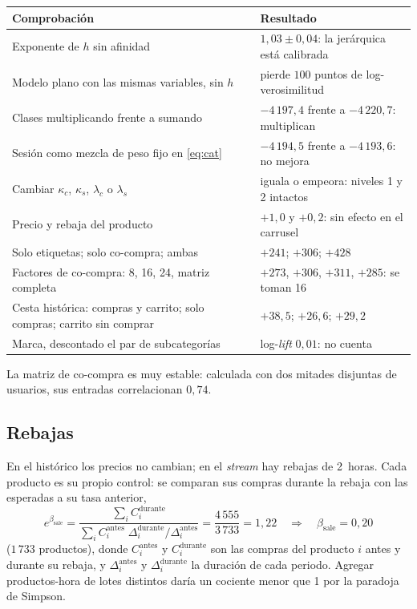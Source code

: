 \documentclass[11pt,a4paper]{article}
\begin{document}
\begin{center}
\small
\begin{tabular}{p{8.3cm}p{6.6cm}}
\toprule
Comprobación & Resultado\\
\midrule
Exponente de $h$ sin afinidad & $1{,}03\pm0{,}04$: la jerárquica está calibrada\\
Modelo plano con las mismas variables, sin $h$ & pierde $100$ puntos de log-verosimilitud\\
Clases multiplicando frente a sumando & $-4\,197{,}4$ frente a $-4\,220{,}7$: multiplican\\
Sesión como mezcla de peso fijo en \eqref{eq:cat} & $-4\,194{,}5$ frente a $-4\,193{,}6$: no mejora\\
Cambiar $\kappa_c$, $\kappa_s$, $\lambda_c$ o $\lambda_s$ & iguala o empeora: niveles 1 y 2 intactos\\
Precio y rebaja del producto & $+1{,}0$ y $+0{,}2$: sin efecto en el carrusel\\
Solo etiquetas; solo co-compra; ambas & $+241$; $+306$; $+428$\\
Factores de co-compra: 8, 16, 24, matriz completa & $+273$, $+306$, $+311$, $+285$: se toman 16\\
Cesta histórica: compras y carrito; solo compras; carrito sin comprar & $+38{,}5$; $+26{,}6$; $+29{,}2$\\
Marca, descontado el par de subcategorías & log-\emph{lift} $0{,}01$: no cuenta\\
\bottomrule
\end{tabular}
\end{center}

La matriz de co-compra es muy estable: calculada con dos mitades disjuntas de usuarios, sus entradas
correlacionan $0{,}74$.

\subsection{Rebajas}

En el histórico los precios no cambian; en el \emph{stream} hay rebajas de 2~horas. Cada producto es su
propio control: se comparan sus compras durante la rebaja con las esperadas a su tasa anterior,
\[
e^{\beta_{\text{sale}}}=\frac{\sum_i C_i^{\text{durante}}}{\sum_i C_i^{\text{antes}}\;\Delta_i^{\text{durante}}/\Delta_i^{\text{antes}}}
=\frac{4\,555}{3\,733}=1{,}22\quad\Longrightarrow\quad\beta_{\text{sale}}=0{,}20
\]
($1\,733$ productos), donde $C_i^{\text{antes}}$ y $C_i^{\text{durante}}$ son las compras del producto $i$
antes y durante su rebaja, y $\Delta_i^{\text{antes}}$ y $\Delta_i^{\text{durante}}$ la duración de cada
periodo. Agregar productos-hora de lotes distintos daría un cociente menor que 1 por la
paradoja de Simpson.
\end{document}
